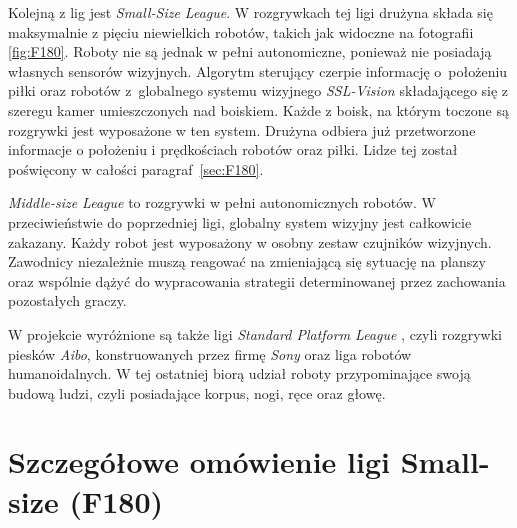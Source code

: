	Kolejną z lig jest \emph{Small-Size League}. W rozgrywkach tej ligi drużyna składa się maksymalnie z pięciu niewielkich robotów, takich jak widoczne na fotografii \ref{fig:F180}. 
	Roboty  nie są jednak w pełni autonomiczne, ponieważ nie posiadają własnych sensorów wizyjnych. Algorytm sterujący czerpie informację o~położeniu piłki oraz robotów z~globalnego systemu
	wizyjnego \textit{SSL-Vision} składającego się z szeregu kamer umieszczonych nad boiskiem. Każde z boisk, na którym toczone są rozgrywki jest wyposażone w ten system. Drużyna odbiera już przetworzone
	informacje o położeniu i prędkościach robotów oraz piłki.
	Lidze tej został poświęcony w całości paragraf~\ref{sec:F180}.	

	\emph{Middle-size League} to rozgrywki w pełni autonomicznych robotów. W przeciwieństwie do poprzedniej ligi, globalny system wizyjny jest całkowicie zakazany.
	Każdy robot jest wyposażony w osobny zestaw czujników wizyjnych. Zawodnicy niezależnie muszą reagować na zmieniającą się sytuację na planszy oraz
	wspólnie dążyć do wypracowania strategii determinowanej przez zachowania pozostałych graczy.

	W projekcie wyróżnione są także ligi \emph{Standard Platform League }, czyli rozgrywki piesków \textit{Aibo}, konstruowanych przez firmę \textit{Sony} oraz 
	liga robotów humanoidalnych. W tej ostatniej biorą udział roboty przypominające swoją budową ludzi, czyli posiadające korpus, nogi, ręce oraz głowę.
	\section{Szczegółowe omówienie ligi Small-size (F180) \label{sec:F180}}

